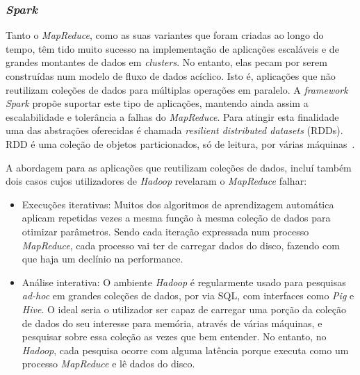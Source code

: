 \subsubsection{\textit{Spark}}
\label{estadoARte_spark}
Tanto o \textit{MapReduce}, como as suas variantes que foram criadas ao longo do tempo, têm tido muito sucesso na implementação de aplicações escaláveis e de grandes montantes de dados em \textit{clusters}. No entanto, elas pecam por serem construídas num modelo de fluxo de dados acíclico. Isto é, aplicações que não reutilizam coleções de dados para múltiplas operações em paralelo. A \textit{framework Spark} propõe suportar este tipo de aplicações, mantendo ainda assim a escalabilidade e tolerância a falhas do \textit{MapReduce}. Para atingir esta finalidade uma das abstrações oferecidas é chamada \textit{resilient distributed datasets} (RDDs). RDD é uma coleção de objetos particionados, só de leitura, por várias máquinas~\cite{zaharia2010spark}. 

A abordagem para as aplicações que reutilizam coleções de dados, incluí também dois casos cujos utilizadores de \textit{Hadoop} revelaram o \textit{MapReduce} falhar:
\begin{itemize}
    \item Execuções iterativas: Muitos dos algoritmos de aprendizagem automática aplicam repetidas vezes a mesma função à mesma coleção de dados para otimizar parâmetros. Sendo cada iteração expressada num processo \textit{MapReduce}, cada processo vai ter de carregar dados do disco, fazendo com que haja um declínio na performance.
    \item Análise interativa: O ambiente \textit{Hadoop} é regularmente usado para pesquisas \textit{ad-hoc} em grandes coleções de dados, por via SQL, com interfaces como \textit{Pig} e \textit{Hive}. O ideal seria o utilizador ser capaz de carregar uma porção da coleção de dados do seu interesse para memória, através de várias máquinas, e pesquisar sobre essa coleção as vezes que bem entender. No entanto, no \textit{Hadoop}, cada pesquisa ocorre com alguma latência porque executa como um processo \textit{MapReduce} e lê dados do disco.
\end{itemize}

